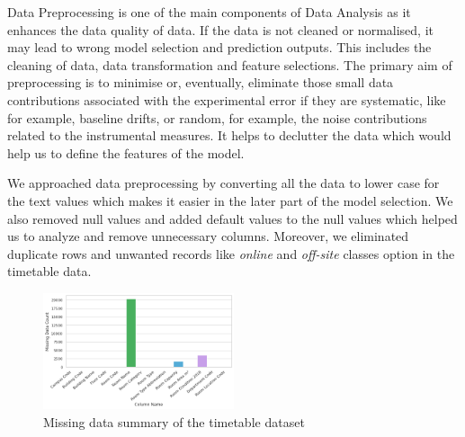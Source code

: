 \thispagestyle{empty}
\par Data Preprocessing is one of the main components of Data Analysis as it enhances the data quality of data. If the data is not cleaned or normalised, it may lead to wrong model selection and prediction outputs. This includes the cleaning of data, data transformation and feature selections. The primary aim of preprocessing is to minimise or, eventually, eliminate those small data contributions associated with the experimental error if they are systematic, like for example, baseline drifts, or random, for example, the noise contributions related to the instrumental measures\cite{pre_processing}.
It helps to declutter the data which would help us to define the features of the model. 

We approached data preprocessing by converting all the data to lower case for the text values which makes it easier in the later part of the model selection. We also removed null values and added default values to the null values which helped us to analyze and remove unnecessary columns. Moreover, we eliminated duplicate rows and unwanted records like \textit{online} and \textit{off-site} classes option in the timetable data.
\begin{figure}[H]
    \centering
    \includegraphics[width=0.5\textwidth]{resources/images/snap-9.png}
    \caption{Missing data summary of the timetable dataset}
    \label{timetable_data}
\end{figure}



